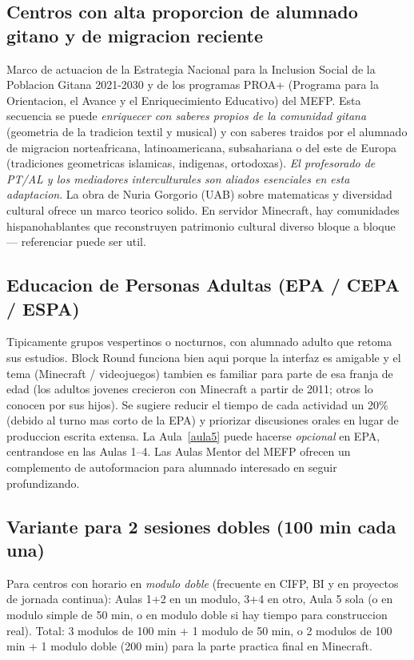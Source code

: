 \documentclass[12pt,a4paper]{scrartcl}
\begin{document}
\subsection{Centros con alta proporcion de alumnado gitano y de migracion reciente}
Marco de actuacion de la Estrategia Nacional para la Inclusion Social de la Poblacion Gitana 2021-2030 y de los programas PROA+ (Programa para la Orientacion, el Avance y el Enriquecimiento Educativo) del MEFP. Esta secuencia se puede \emph{enriquecer con saberes propios de la comunidad gitana} (geometria de la tradicion textil y musical) y con saberes traidos por el alumnado de migracion norteafricana, latinoamericana, subsahariana o del este de Europa (tradiciones geometricas islamicas, indigenas, ortodoxas). \emph{El profesorado de PT/AL y los mediadores interculturales son aliados esenciales en esta adaptacion}. La obra de Nuria Gorgorio (UAB) sobre matematicas y diversidad cultural ofrece un marco teorico solido. En servidor Minecraft, hay comunidades hispanohablantes que reconstruyen patrimonio cultural diverso bloque a bloque --- referenciar puede ser util.

\subsection{Educacion de Personas Adultas (EPA / CEPA / ESPA)}
Tipicamente grupos vespertinos o nocturnos, con alumnado adulto que retoma sus estudios. Block Round funciona bien aqui porque la interfaz es amigable y el tema (Minecraft / videojuegos) tambien es familiar para parte de esa franja de edad (los adultos jovenes crecieron con Minecraft a partir de 2011; otros lo conocen por sus hijos). Se sugiere reducir el tiempo de cada actividad un 20\% (debido al turno mas corto de la EPA) y priorizar discusiones orales en lugar de produccion escrita extensa. La Aula~\ref{aula5} puede hacerse \emph{opcional} en EPA, centrandose en las Aulas 1--4. Las Aulas Mentor del MEFP ofrecen un complemento de autoformacion para alumnado interesado en seguir profundizando.

\subsection{Variante para 2 sesiones dobles (100 min cada una)}
Para centros con horario en \emph{modulo doble} (frecuente en CIFP, BI y en proyectos de jornada continua): Aulas 1+2 en un modulo, 3+4 en otro, Aula 5 sola (o en modulo simple de 50 min, o en modulo doble si hay tiempo para construccion real). Total: 3 modulos de 100 min + 1 modulo de 50 min, o 2 modulos de 100 min + 1 modulo doble (200 min) para la parte practica final en Minecraft.
\end{document}
